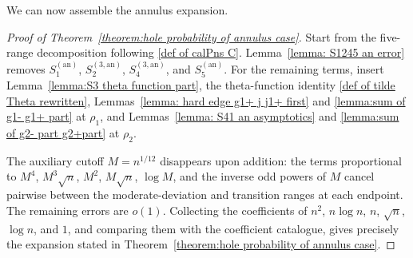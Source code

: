 \documentclass[a4paper]{article}
\numberwithin{equation}{section}
\begin{document}
We can now assemble the annulus expansion.
\begin{proof}[Proof of Theorem~\ref{theorem:hole probability of annulus case}]
Start from the five-range decomposition following \eqref{def of calPns C}. Lemma~\ref{lemma: S1245 an error} removes $S_1^{(\mathrm{an})}$, $S_2^{(3,\mathrm{an})}$, $S_4^{(3,\mathrm{an})}$, and $S_5^{(\mathrm{an})}$. For the remaining terms, insert Lemma~\ref{lemma:S3 theta function part}, the theta-function identity \eqref{def of tilde Theta rewritten}, Lemmas~\ref{lemma: hard edge g1+ j j1+ first} and \ref{lemma:sum of g1- g1+ part} at $\rho_1$, and Lemmas~\ref{lemma: S41 an asymptotics} and \ref{lemma:sum of g2- part g2+part} at $\rho_2$.

The auxiliary cutoff $M=n^{1/12}$ disappears upon addition: the terms proportional to $M^4$, $M^3\sqrt n$, $M^2$, $M\sqrt n$, $\log M$, and the inverse odd powers of $M$ cancel pairwise between the moderate-deviation and transition ranges at each endpoint. The remaining errors are $o(1)$. Collecting the coefficients of $n^2$, $n\log n$, $n$, $\sqrt n$, $\log n$, and $1$, and comparing them with the coefficient catalogue, gives precisely the expansion stated in Theorem~\ref{theorem:hole probability of annulus case}.
\end{proof}

\end{document}
